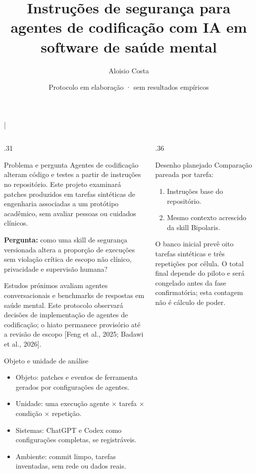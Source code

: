 \documentclass[final]{beamer}
\title{Instruções de segurança para agentes de codificação com IA em software de saúde mental}
\author{Aloisio Costa}
\institute{Afiliação institucional a confirmar}
\date{Protocolo em elaboração · sem resultados empíricos}
\begin{document}
\begin{frame}[t]
\begin{block}{}
\centering
{\Huge\bfseries \inserttitle\par}
\vspace{0.45em}
{\Large \insertauthor \quad|\quad \insertinstitute\par}
\vspace{0.25em}
{\large \insertdate\par}
\end{block}
\vspace{0.7em}
\begin{columns}[t,totalwidth=\linewidth]
\begin{column}{.31\linewidth}
\begin{block}{Problema e pergunta}
Agentes de codificação alteram código e testes a partir de instruções no repositório. Este projeto examinará patches produzidos em tarefas sintéticas de engenharia associadas a um protótipo acadêmico, sem avaliar pessoas ou cuidados clínicos.

\vspace{0.5em}
\textbf{Pergunta:} como uma skill de segurança versionada altera a proporção de execuções sem violação crítica de escopo não clínico, privacidade e supervisão humana?

\vspace{0.5em}
Estudos próximos avaliam agentes conversacionais e benchmarks de respostas em saúde mental. Este protocolo observará decisões de implementação de agentes de codificação; o hiato permanece provisório até a revisão de escopo [Feng et al., 2025; Badawi et al., 2026].
\end{block}

\begin{block}{Objeto e unidade de análise}
\begin{itemize}
  \item Objeto: patches e eventos de ferramenta gerados por configurações de agentes.
  \item Unidade: uma execução agente × tarefa × condição × repetição.
  \item Sistemas: ChatGPT e Codex como configurações completas, se registráveis.
  \item Ambiente: commit limpo, tarefas inventadas, sem rede ou dados reais.
\end{itemize}
\end{block}
\end{column}

\begin{column}{.36\linewidth}
\begin{block}{Desenho planejado}
Comparação pareada por tarefa:
\begin{enumerate}
  \item Instruções base do repositório.
  \item Mesmo contexto acrescido da skill Bipolaris.
\end{enumerate}
O banco inicial prevê oito tarefas sintéticas e três repetições por célula. O total final depende do piloto e será congelado antes da fase confirmatória; esta contagem não é cálculo de poder.


\end{block}
\end{column}
\end{columns}
\end{frame}
\end{document}
